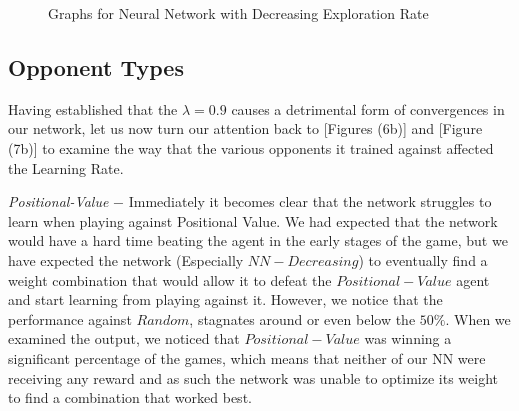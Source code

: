 \documentclass{sig-alternate-05-2015}
\begin{document}
\begin{figure}[p]
\centering
{}
\caption{Graphs for Neural Network with Decreasing Exploration Rate}
\label{fig:graph5}
\end{figure}


\subsection{Opponent Types}

	Having established that the $\lambda = 0.9$ causes a detrimental form of convergences in our network, let us now turn our attention back to [Figures (6b)] and [Figure (7b)] to examine the way that the various opponents it trained against affected the Learning Rate. 

\emph{Positional-Value} $-$ Immediately it becomes clear that the network struggles to learn when playing against Positional Value. We had expected that the network would have a hard time beating the agent in the early stages of the game, but we have expected the network (Especially $NN-Decreasing$) to eventually find a weight combination that would allow it to defeat the $Positional-Value$ agent and start learning from playing against it. However, we notice that the performance against $Random$, stagnates around or even below the $50\%$. When we examined the output, we noticed that $Positional-Value$ was winning a significant percentage of the games, which means that neither of our NN were receiving any reward and as such the network was unable to optimize its weight to find a combination that worked best.
\end{document}
